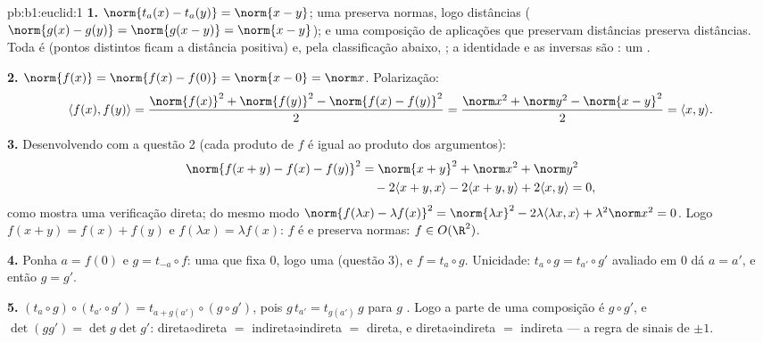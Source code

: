 \begin{solution}{pb:b1:euclid:1}
\textbf{1.} $\norm{t_a(x) - t_a(y)} = \norm{x - y}$; uma   preserva normas, logo
distâncias ($\norm{g(x) - g(y)} =
\norm{g(x - y)} = \norm{x-y}$); e uma composição de aplicações que preservam
distâncias preserva distâncias. Toda  é  (pontos
distintos ficam a distância positiva) e, pela classificação abaixo,
; a identidade e as inversas são : um .

\textbf{2.} $\norm{f(x)} = \norm{f(x) - f(0)} = \norm{x - 0} =
\norm x$. Polarização:
\[
\langle f(x), f(y)\rangle
= \frac{\norm{f(x)}^2 + \norm{f(y)}^2 - \norm{f(x) -
f(y)}^2}{2}
= \frac{\norm x^2 + \norm y^2 - \norm{x - y}^2}{2}
= \langle x, y\rangle .
\]

\textbf{3.} Desenvolvendo com a questão 2 (cada produto de $f$ é
igual ao produto dos argumentos):
\begin{align*}
\norm{f(x+y) - f(x) - f(y)}^2
&= \norm{x+y}^2 + \norm x^2 + \norm y^2\\
&\quad - 2\langle x+y, x\rangle - 2\langle x+y, y\rangle
+ 2\langle x, y\rangle = 0 ,
\end{align*}
como mostra uma verificação direta; do mesmo modo $\norm{f(\lambda x) -
\lambda f(x)}^2 = \norm{\lambda x}^2 - 2\lambda\langle \lambda
x, x\rangle + \lambda^2\norm x^2 = 0$. Logo $f(x + y) = f(x) +
f(y)$
e $f(\lambda x) = \lambda f(x)$: $f$ é  e preserva normas: $f \in O(\R^2)$.

\textbf{4.} Ponha $a = f(0)$ e $g = t_{-a}\circ f$: uma  que fixa $0$, logo
uma   (questão 3), e $f = t_a
\circ g$. Unicidade: $t_a \circ g = t_{a'}\circ g'$ avaliado
em $0$ dá $a = a'$, e então $g = g'$.

\textbf{5.} $(t_a\circ g)\circ(t_{a'}\circ g') = t_{a +
g(a')}\circ(g\circ g')$, pois $g\,t_{a'} = t_{g(a')}\,g$ para $g$ . Logo a parte 
de uma composição é $g \circ g'$, e $\det(gg') = \det g \det g'$: direta$\circ$direta $=$
indireta$\circ$indireta $=$ direta, e direta$\circ$indireta $=$
indireta --- a regra de sinais de $\pm1$.


\end{solution}
